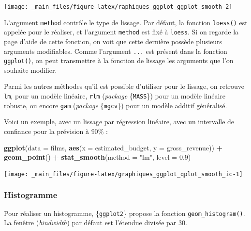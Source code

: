 \documentclass[
  11pt,
]{book}
\newenvironment{Shaded}{\begin{snugshade}}{\end{snugshade}}
\newcommand{\DataTypeTok}[1]{\textcolor[rgb]{0.13,0.29,0.53}{#1}}
\newcommand{\FloatTok}[1]{\textcolor[rgb]{0.00,0.00,0.81}{#1}}
\newcommand{\KeywordTok}[1]{\textcolor[rgb]{0.13,0.29,0.53}{\textbf{#1}}}
\newcommand{\NormalTok}[1]{#1}
\newcommand{\OperatorTok}[1]{\textcolor[rgb]{0.81,0.36,0.00}{\textbf{#1}}}
\newcommand{\StringTok}[1]{\textcolor[rgb]{0.31,0.60,0.02}{#1}}
\numberwithin{equation}{section}
\numberwithin{countremarque}{section}
\begin{document}
\begin{center}\texttt{[image: \_main\_files/figure-latex/raphiques\_ggplot\_ggplot\_smooth-2]} \end{center}

L'argument \texttt{method} contrôle le type de lissage. Par défaut, la fonction \texttt{loess()} est appelée pour le réaliser, et l'argument \texttt{method} est fixé à \texttt{loess}. Si on regarde la page d'aide de cette fonction, on voit que cette dernière possède plusieurs arguments modifiables. Comme l'argument \texttt{...} est présent dans la fonction \texttt{ggplot()}, on peut transmettre à la fonction de lissage les arguments que l'on souhaite modifier.

Parmi les autres méthodes qu'il est possible d'utiliser pour le lissage, on retrouve \texttt{lm}, pour un modèle linéaire, \texttt{rlm} (\emph{package} \{\texttt{MASS}\}) pour un modèle linéaire robuste, ou encore \texttt{gam} (\emph{package} \{\texttt{mgcv}\}) pour un modèle additif généralisé.

Voici un exemple, avec un lissage par régression linéaire, avec un intervalle de confiance pour la prévision à \(90\%\) :

\begin{Shaded}
\begin{Highlighting}[]
\KeywordTok{ggplot}\NormalTok{(}\DataTypeTok{data =}\NormalTok{ films, }
       \KeywordTok{aes}\NormalTok{(}\DataTypeTok{x =}\NormalTok{ estimated\_budget, }\DataTypeTok{y =}\NormalTok{ gross\_revenue)) }\OperatorTok{+}
\StringTok{  }\KeywordTok{geom\_point}\NormalTok{() }\OperatorTok{+}
\StringTok{  }\KeywordTok{stat\_smooth}\NormalTok{(}\DataTypeTok{method =} \StringTok{"lm"}\NormalTok{, }\DataTypeTok{level =} \FloatTok{0.9}\NormalTok{)}
\end{Highlighting}
\end{Shaded}

\begin{center}\texttt{[image: \_main\_files/figure-latex/graphiques\_ggplot\_qplot\_smooth\_ic-1]} \end{center}

\hypertarget{graphiques_qplot_geom_histogram}{%
\subsubsection{Histogramme}\label{graphiques_qplot_geom_histogram}}

Pour réaliser un histogramme, \{\texttt{ggplot2}\} propose la fonction \texttt{geom\_histogram()}. La fenêtre (\emph{bindwidth}) par défaut est l'étendue divisée par 30.
\end{document}
